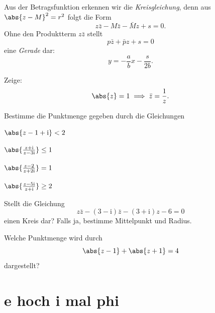 \documentclass[%
11pt,%
twoside,%
titlepage,%
german,%
headsepline%
]{scrartcl}
\begin{document}
Aus der Betragsfunktion erkennen wir die \emph{Kreisgleichung}, denn aus $\abs{z-M}^2=r^2$ folgt die Form
$$z\bar{z}-M\bar{z}-\bar{M}z+s=0.$$
Ohne den Produktterm $z\bar{z}$ stellt
$$p\bar{z}+\bar{p}z+s=0$$
eine \emph{Gerade} dar:
$$y=-\frac{a}{b}x-\frac{s}{2b}.$$

\begin{ueb}[Kehrwert]
Zeige:
$$\abs{z}=1\implies\bar{z}=\frac{1}{z}.$$
\end{ueb}

\begin{ueb}[Punktmengen]
Bestimme die Punktmenge gegeben durch die Gleichungen

\begin{minipage}{0.3\textwidth}
\begin{enumeratea}
\item $\abs{z-1+\mathrm{i}}<2$
\item $\abs{\frac{z+\mathrm{i}}{z-3\mathrm{i}}}\leq1$
\end{enumeratea}
\end{minipage}
\begin{minipage}{0.4\textwidth}
\begin{enumeratea}
\setcounter{enumi}{2}
\item $\abs{\frac{z-2}{z+2\mathrm{i}}}=1$
\item $\abs{\frac{z-5\mathrm{i}}{z+\mathrm{i}}}\geq2$
\end{enumeratea}
\end{minipage}
\end{ueb}

\begin{ueb}[Kreis]
Stellt die Gleichung
$$z\bar{z}-(3-\mathrm{i})\bar{z}-(3+\mathrm{i})z-6=0$$
einen Kreis dar? Falls ja, bestimme Mittelpunkt und Radius.
\end{ueb}

\begin{ueb}[Geraden]
Welche Punktmenge wird durch
$$\abs{z-1}+\abs{z+1}=4$$
dargestellt?
\end{ueb}

\section{e hoch i mal phi}
\end{document}

